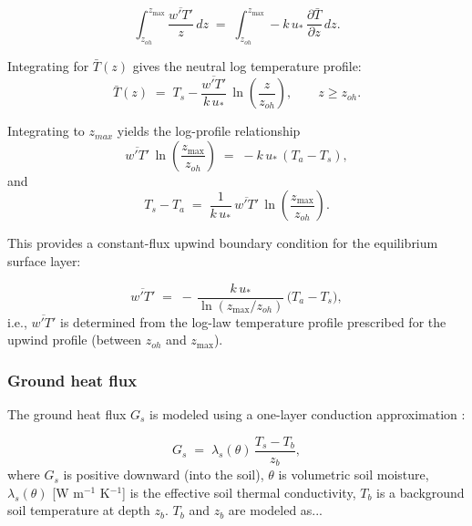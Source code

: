 \documentclass{article}
\begin{document}
    
    \begin{equation}
    \int_{z_{oh}}^{z_{\max}}\frac{\overline{w'T'}}{z}\,dz
    \;=\;
    \int_{z_{oh}}^{z_{\max}} -k\,u_*\,\frac{\partial \bar T}{\partial z}\,dz .
    \end{equation}

    Integrating for $\bar T(z)$ gives the neutral log temperature profile:
    \begin{equation}
    \bar T(z)
    \;=\;
    T_s
    -\frac{\overline{w'T'}}{k\,u_*}\,
    \ln\!\left(\frac{z}{z_{oh}}\right),
    \qquad z\ge z_{oh}.
    \label{eq:T_log_profile}
    \end{equation}

    Integrating to $z_{max}$ yields the log-profile relationship
    \begin{equation}
    \overline{w'T'} \,\ln\!\left(\frac{z_{\max}}{z_{oh}}\right)
    \;=\;
    -k\,u_*\,(T_a - T_s),
    \end{equation}
    and
    \begin{equation}
    T_s - T_a
    \;=\;
    \frac{1}{k\,u_*}\,\overline{w'T'}\,
    \ln\!\left(\frac{z_{\max}}{z_{oh}}\right).
    \label{eq:Ts_minus_Ta}
    \end{equation}


This provides a constant-flux upwind boundary condition for the equilibrium surface layer:

\begin{equation}
\overline{w'T'} \;=\; -\,\frac{k\,u_*}{\ln(z_{\max}/z_{oh})}\,\big(T_a - T_s\big),
\end{equation}
i.e., $\overline{w'T'}$ is determined from the log-law temperature profile prescribed for the upwind profile (between $z_{oh}$ and $z_{\max}$).

    
\subsubsection{Ground heat flux}  

    The ground heat flux $G_s$ is modeled using a one-layer conduction approximation \cite{xiong2023new}:

    \begin{equation}
    \label{eq:Gs_conduction}
    G_s \;=\; \lambda_s(\theta)\,\frac{T_s - T_b}{z_b},
    \end{equation}
    where $G_s$ is positive downward (into the soil), 
    $\theta$ is volumetric soil moisture, 
    $\lambda_s(\theta)$ [W m$^{-1}$ K$^{-1}$] is the effective soil thermal conductivity, 
    $T_b$ is a background soil temperature at depth $z_b$. 
    $T_b$ and $z_b$ are modeled as... 
\end{document}
